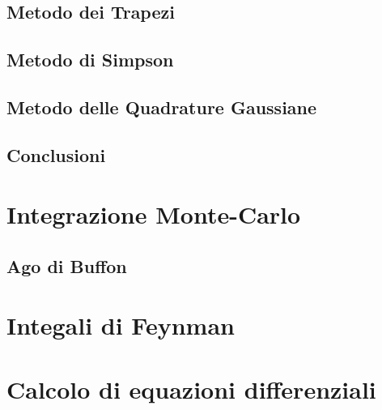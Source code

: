 \documentclass[a4paper,10pt]{article}
\begin{document}
\subsection{Metodo dei Trapezi}
\subsection{Metodo di Simpson}
\subsection{Metodo delle Quadrature Gaussiane}
\subsection{Conclusioni}

\section{Integrazione Monte-Carlo}
\subsection{Ago di Buffon}

\section{Integali di Feynman}

\section{Calcolo di equazioni differenziali}
\end{document}
